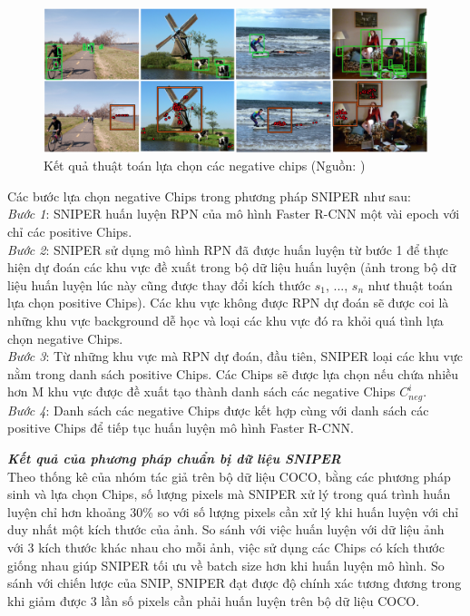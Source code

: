 {    \begin{figure}[H]
        \centering
        \includegraphics[width=13cm] {images/sniper_neg_chip}
        \caption{Kết quả thuật toán lựa chọn các negative chips (Nguồn: \cite{singh2018sniper})}
        \label{fig:sniper_pos_chip}
    \end{figure}

    \noindent
    Các bước lựa chọn negative Chips trong phương pháp SNIPER  như sau: \\
    \textit{Bước 1}: SNIPER  huấn luyện RPN của mô hình Faster R-CNN một vài epoch với chỉ các positive Chips. \\
    \textit{Bước 2}: SNIPER  sử dụng mô hình RPN đã được huấn luyện từ bước 1 để thực hiện dự đoán các khu vực đề xuất trong bộ dữ liệu huấn luyện (ảnh trong bộ dữ liệu huấn luyện lúc này cũng được thay đổi kích thước {${s}_{1}$, ..., ${s}_{n}$} như thuật toán lựa chọn positive Chips).
    Các khu vực không được RPN dự đoán sẽ được coi là những khu vực background  dễ học và loại các khu vực đó ra khỏi quá tình lựa chọn negative Chips. \\
    \textit{Bước 3}: Từ những khu vực mà RPN dự đoán, đầu tiên, SNIPER  loại các khu vực nằm trong danh sách positive Chips.
    Các Chips sẽ được lựa chọn nếu chứa nhiều hơn M khu vực được đề xuất tạo thành danh sách các negative Chips ${C}_{neg}^{i}$. \\
    \textit{Bước 4}: Danh sách các negative Chips được kết hợp cùng với danh sách các positive Chips để tiếp tục huấn luyện mô hình Faster R-CNN.

    \noindent
    \textbf{\textit{Kết quả của phương pháp chuẩn bị dữ liệu SNIPER }} \\
    Theo thống kê của nhóm tác giả trên bộ dữ liệu COCO, bằng các phương pháp sinh và lựa chọn Chips, số lượng pixels  mà SNIPER  xử lý trong quá trình huấn luyện chỉ hơn khoảng 30\% so với số lượng pixels  cần xử lý khi huấn luyện với chỉ duy nhất một kích thước của ảnh.
    So sánh với việc huấn luyện với dữ liệu ảnh với 3 kích thước khác nhau cho mỗi ảnh, việc sử dụng các Chips có kích thước giống nhau giúp SNIPER  tối ưu về batch size hơn khi huấn luyện mô hình.
    So sánh với chiến lược của SNIP, SNIPER  đạt được độ chính xác tương đương trong khi giảm được 3 lần số pixels  cần phải huấn luyện trên bộ dữ liệu COCO.

}
